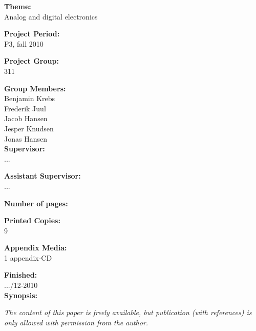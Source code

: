 \begin{multicols}{2}

\small{\textbf{Theme:\\}
Analog and digital electronics

\textbf{Project Period:\\}
P3, fall 2010

\textbf{Project Group:\\}
311

\textbf{Group Members:\\}
Benjamin Krebs\\
Frederik Juul\\
Jacob Hansen\\
Jesper Knudsen\\
Jonas Hansen\\

\textbf{Supervisor:\\}
...

\textbf{Assistant Supervisor:\\}
...

\textbf{Number of pages:\\}
\pageref{LastPage}

\textbf{Printed Copies:\\}
9

\textbf{Appendix Media:\\}
1 appendix-CD

\textbf{Finished:\\}
.../12-2010
\\
\textbf{Synopsis:}}

\newline
\end{multicols}
\textit{\scriptsize{The content of this paper is freely available, but publication (with references) is only allowed with permission from the author.}}